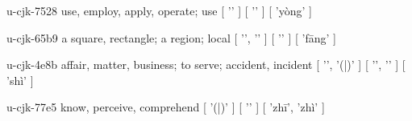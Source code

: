 \begin{multicols}{2}
\lettrine[lines=3]{\cjkgGlue{}}{}\begin{minipage}{0.8\linewidth} u-cjk-7528  use, employ, apply, operate; use  [ '\cjkgGlue{}' ]  [ '\cjkgGlue{}' ]  [ 'yòng' ] \end{minipage}

\lettrine[lines=3]{\cjkgGlue{}}{}\begin{minipage}{0.8\linewidth} u-cjk-65b9  a square, rectangle; a region; local  [ '\cjkgGlue{}', '\cjkgGlue{}' ]  [ '\cjkgGlue{}' ]  [ 'fāng' ] \end{minipage}

\lettrine[lines=3]{\cjkgGlue{}}{}\begin{minipage}{0.8\linewidth} u-cjk-4e8b  affair, matter, business; to serve; accident, incident  [ '\cjkgGlue{}', '\cjkgGlue{}(\cjkgGlue{}|\cjkgGlue{})' ]  [ '\cjkgGlue{}', '\cjkgGlue{}' ]  [ 'shì' ] \end{minipage}

\lettrine[lines=3]{\cjkgGlue{}}{}\begin{minipage}{0.8\linewidth} u-cjk-77e5  know, perceive, comprehend  [ '\cjkgGlue{}(\cjkgGlue{}|\cjkgGlue{})' ]  [ '\cjkgGlue{}' ]  [ 'zhī', 'zhì' ] \end{minipage}


\end{multicols}
